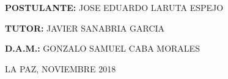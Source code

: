 \begin{titlepage}
\begin{center}
    \vspace*{0.2in}
    
    \begin{large}
    \textbf{POSTULANTE:} JOSE EDUARDO LARUTA ESPEJO\\
    \end{large}
    
    \begin{large}
    \hspace{0.08in} \textbf{TUTOR:} JAVIER SANABRIA GARCIA\\
    \end{large}
    
    \begin{large}
    \hspace{0.44in} \textbf{D.A.M.:} GONZALO SAMUEL CABA MORALES\\
    \end{large}
    
    \vspace*{0.2in}
    
    \begin{normalsize}
    LA PAZ, NOVIEMBRE 2018\\
    \end{normalsize}
    \end{center}
    \end{titlepage}
    
    
    \thispagestyle{empty}